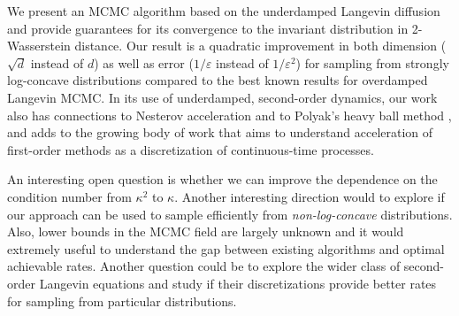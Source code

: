 We present an MCMC algorithm based on the underdamped Langevin diffusion and provide guarantees for its convergence to the invariant distribution in 2-Wasserstein distance. Our result is a quadratic improvement in both dimension ($\sqrt{d}$ instead of $d$) as well as error ($1/\varepsilon$ instead of $1/\varepsilon^2$) for sampling from strongly log-concave distributions compared to the best known results for overdamped Langevin MCMC. In its use of underdamped, second-order dynamics, our work also has connections to Nesterov acceleration \citep{nesterov} and to Polyak's heavy ball method \citep{polyak}, and adds to the growing body of work that aims to understand acceleration of first-order methods as a discretization of continuous-time processes. 

An interesting open question is whether we can improve the dependence on the condition number from $\kappa^2$ to $\kappa$. Another interesting direction would to explore if our approach can be used to sample efficiently from \emph{non-log-concave} distributions. Also, lower bounds in the MCMC field are largely unknown and it would extremely useful to understand the gap between existing algorithms and optimal achievable rates. Another question could be to explore the wider class of second-order Langevin equations and study if their discretizations provide better rates for sampling from particular distributions.